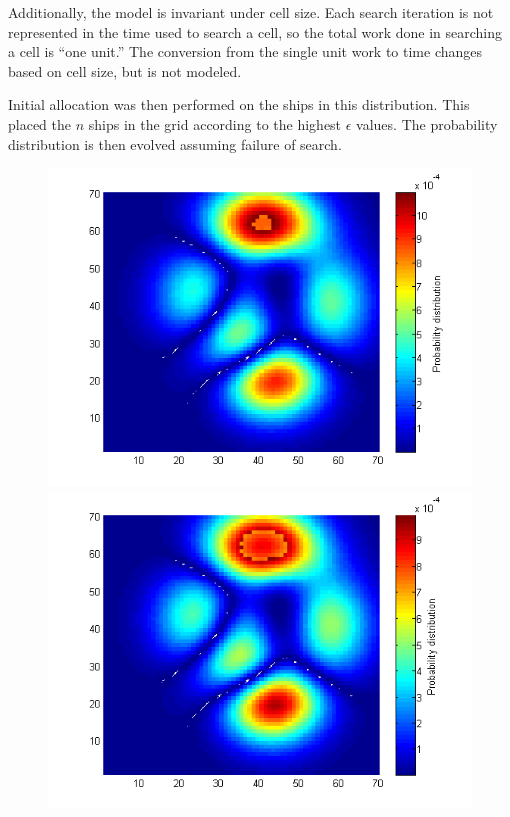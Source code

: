 \documentclass[a4paper]{article}
\begin{document}
Additionally, the model is invariant under cell size. Each search iteration is not represented in the time used to search a cell, so the total work done in searching a cell is ``one unit.'' The conversion from the single unit work to time changes based on cell size, but is not modeled.

Initial allocation was then performed on the ships in this distribution. This placed the $n$ ships in the grid according to the highest $\epsilon$ values. The probability distribution is then evolved assuming failure of search. 

\begin{figure}[H]\begin{center}
\includegraphics[scale=0.35]{../Matlab/Images/ModelSearch001.png}
\includegraphics[scale=0.35]{../Matlab/Images/ModelSearch020.png}

\end{center}
\end{figure}
\end{document}
